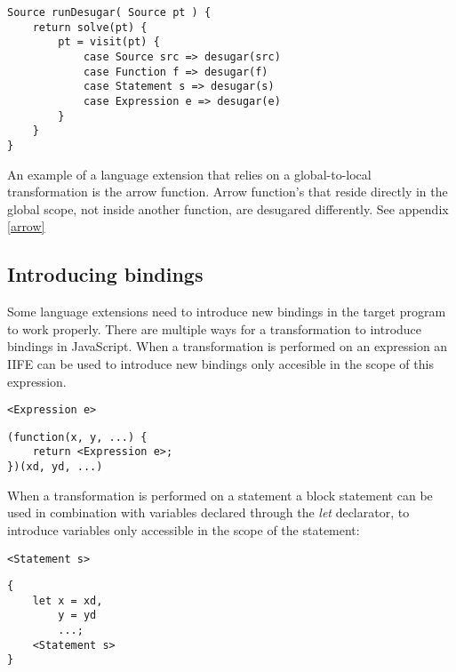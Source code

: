 \begin{lstlisting}[caption=Final desugar visitor, language=rascal]
Source runDesugar( Source pt ) {
	return solve(pt) {
		pt = visit(pt) {
			case Source src => desugar(src)
			case Function f => desugar(f)
			case Statement s => desugar(s)
			case Expression e => desugar(e)
		}
	}
}
\end{lstlisting}

An example of a language extension that relies on a global-to-local transformation is the arrow function. Arrow function's that reside directly in the global scope, not inside another function, are desugared differently. See appendix \ref{arrow}

\subsection{Introducing bindings}
Some language extensions need to introduce new bindings in the target program to work properly. There are multiple ways for a transformation to introduce bindings in JavaScript. When a transformation is performed on an expression an IIFE can be used to introduce new bindings only accesible in the scope of this expression.

\begin{minipage}{0.45\linewidth}
\begin{lstlisting}
<Expression e>
\end{lstlisting}
\end{minipage}
\hfill
\begin{minipage}{0.45\linewidth}
\begin{lstlisting}
(function(x, y, ...) {
	return <Expression e>;
})(xd, yd, ...)
\end{lstlisting}
\end{minipage}

When a transformation is performed on a statement a block statement can be used in combination with variables declared through the \textit{let} declarator, to introduce variables only accessible in the scope of the statement:

\begin{minipage}{0.45\linewidth}
\begin{lstlisting}
<Statement s>
\end{lstlisting}
\end{minipage}
\hfill
\begin{minipage}{0.45\linewidth}
\begin{lstlisting}
{
	let x = xd,
		y = yd
		...;
	<Statement s>
}
\end{lstlisting}
\end{minipage}


